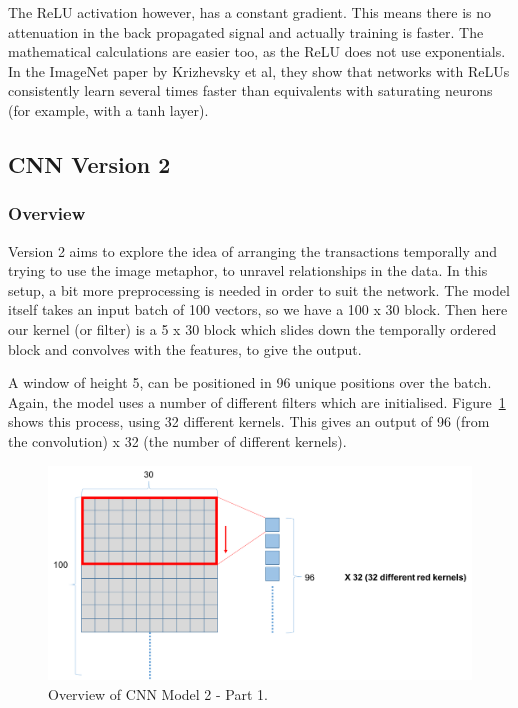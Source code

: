 \documentclass[12pt,a4paper,twoside]{report}
\begin{document}
The ReLU activation however, has a constant gradient. This means there is no attenuation in the back propagated signal and actually training is faster. The mathematical calculations are easier too, as the ReLU does not use exponentials. In the ImageNet\cite{krizhevsky2012imagenet} paper by Krizhevsky et al, they show that networks with ReLUs consistently learn several times faster than equivalents with saturating neurons (for example, with a tanh layer).

\subsection{CNN Version 2}

\subsubsection{Overview}

Version 2 aims to explore the idea of arranging the transactions temporally and trying to use the image metaphor, to unravel relationships in the data. In this setup, a bit more preprocessing is needed in order to suit the network. The model itself takes an input batch of 100 vectors, so we have a 100 x 30 block. Then here our kernel (or filter) is a 5 x 30 block which slides down the temporally ordered block and convolves with the features, to give the output. 

A window of height 5, can be positioned in 96 unique positions over the batch. Again, the model uses a number of different filters which are initialised. Figure~\ref{fig:cnnv2-1} shows this process, using 32 different kernels. This gives an output of 96 (from the convolution) x 32 (the number of different kernels).

\begin{figure}[!htbp]
\centering
\includegraphics[scale=0.5]{cnnv2-1}
\caption{Overview of CNN Model 2 - Part 1.}
\label{fig:cnnv2-1}
\end{figure}
\end{document}
